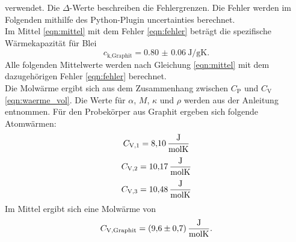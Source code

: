 verwendet. Die $\Delta$-Werte beschreiben die Fehlergrenzen.
Die Fehler werden im Folgenden mithilfe des Python-Plugin uncertainties \cite{uncertainties} berechnet.
\\
Im Mittel \eqref{eqn:mittel} mit dem Fehler \eqref{eqn:fehler} beträgt die spezifische Wärmekapazität für Blei
\begin{equation}
    c_\text{k,Graphit} = \SI{0.80(6)}{\joule/\gram\kelvin} .
\end{equation}
Alle folgenden Mittelwerte werden nach Gleichung \eqref{eqn:mittel} mit dem dazugehörigen Fehler \eqref{eqn:fehler} berechnet.
\\
Die Molwärme ergibt sich aus dem Zusammenhang zwischen $C_\text{P}$ und $C_\text{V}$ \eqref{eqn:waerme_vol}.
Die Werte für $\alpha$, $M$, $\kappa$ und $\rho$ werden aus der Anleitung entnommen. \cite[159]{anleitung}
Für den Probekörper aus Graphit ergeben sich folgende Atomwärmen:
\begin{equation*}
    C_\text{V,1} = \SI{8.10}{\frac{\joule}{\mol\kelvin}}
\end{equation*}
\begin{equation*}
    C_\text{V,2} = \SI{10.17}{\frac{\joule}{\mol\kelvin}}
\end{equation*}
\begin{equation*}
    C_\text{V,3} = \SI{10.48}{\frac{\joule}{\mol\kelvin}}
\end{equation*}
Im Mittel ergibt sich eine Molwärme von
\begin{equation}
    C_\text{V,Graphit} = \SI{9.6(7)}{\frac{\joule}{\mol\kelvin}} .
\end{equation}

